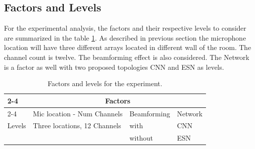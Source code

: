 \subsection{Factors and Levels}

For the experimental analysis, the factors and their respective levels to consider are summarized in the table \ref{tab:facandlev}. As described in previous section the microphone location will have three different arrays located in different wall of the room. The channel count is twelve. The beamforming effect is also considered. The Network is a factor as well with two proposed topologies CNN and ESN as levels.     


\begin{table}[hbt!]
	\caption{Factors and levels for the experiment.}
	\label{tab:facandlev}
	\begin{center}
		\begin{tabular}{|l|l|l|l|}
			\cline{2-4}
			\multicolumn{1}{c|}{}	& \multicolumn{3}{c|}{Factors} \\ 
			\cline{2-4}
			\multicolumn{1}{c|}{}	& Mic location - Num Channels & Beamforming & Network \\ \hline
			Levels
			& Three locations, 12 Channels	& with     & CNN  \\
			&  & without  & ESN  \\\hline
		\end{tabular}
	\end{center}
\end{table}



